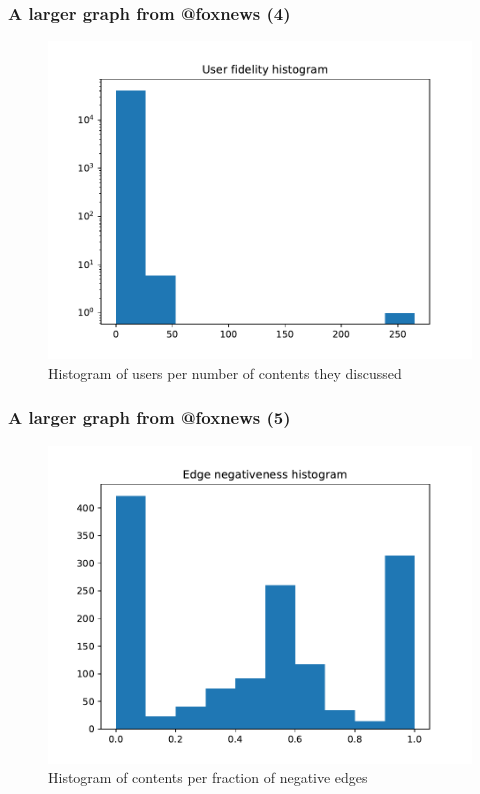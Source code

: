 \documentclass{beamer}
\begin{document}
\begin{frame}[c]
    \frametitle{A larger graph from @foxnews (4)}
    \begin{figure}[htpb]
        \centering
        \includegraphics[width=0.8\linewidth]{out/foxnews400/foxnews400-fidelity-hist.pdf}
        \caption{Histogram of users per number of contents they discussed}%
    \end{figure}
\end{frame}

\begin{frame}[c]
    \frametitle{A larger graph from @foxnews (5)}
    \begin{figure}[htpb]
        \centering
        \includegraphics[width=0.8\linewidth]{out/foxnews400/foxnews400-neg-fraction-hist.pdf}
        \caption{Histogram of contents per fraction of negative edges}%
    \end{figure}
\end{frame}
\end{document}
